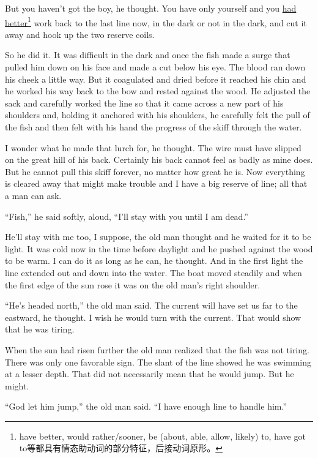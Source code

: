 \documentclass[fontset=ubuntu]{ctexrep}
\begin{document}
But you haven't got the boy, he thought. You have only yourself and you
\uline{had better}\footnote{have better, would rather/sooner, be (about, able,
  allow, likely) to, have got to等都具有情态助动词的部分特征，后接动词原形。}
work back to the last line now, in the dark or not in the dark, and cut it
away and hook up the two reserve coils.

So he did it. It was difficult in the dark and once the fish made a
\gls{surge} that pulled him down on his face and made a cut below his eye.
The blood ran down his cheek a little way. But it \gls{coagulated} and dried
before it reached his \gls{chin} and he worked his way back to the bow and
rested against the wood. He \gls{adjusted} the sack and carefully worked the
line so that it came across a new part of his shoulders and, holding it
\gls{anchored} with his shoulders, he carefully felt the pull of the fish and
then felt with his hand the \gls{progress} of the skiff through the water.

I wonder what he made that \gls{lurch} for, he thought. The wire must have
slipped on the great hill of his back. Certainly his back cannot feel as
badly as mine does. But he cannot pull this skiff forever, no matter how
great he is. Now everything is cleared away that might make trouble and I
have a big reserve of line; all that a man can ask.

``Fish,'' he said softly, aloud, ``I'll stay with you until I am dead.''

He'll stay with me too, I \gls{suppose}, the old man thought and he waited for it
to be light. It was cold now in the time before daylight and he pushed
against the wood to be warm. I can do it as long as he can, he thought. And
in the first light the line \gls{extended} out and down into the water. The boat
moved steadily and when the first edge of the sun rose it was on the old
man's right shoulder.

``He's headed north,'' the old man said. The current will have set us far to
the eastward, he thought. I wish he would turn with the current. That would
show that he was tiring.

When the sun had risen further the old man \gls{realized} that the fish was
not tiring. There was only one \gls{favorable} sign. The slant of the line
showed he was swimming at a lesser depth. That did not \gls{necessarily}
mean that he would jump. But he might.

``God let him jump,'' the old man said. ``I have enough line to \gls{handle}
him.''
\end{document}
